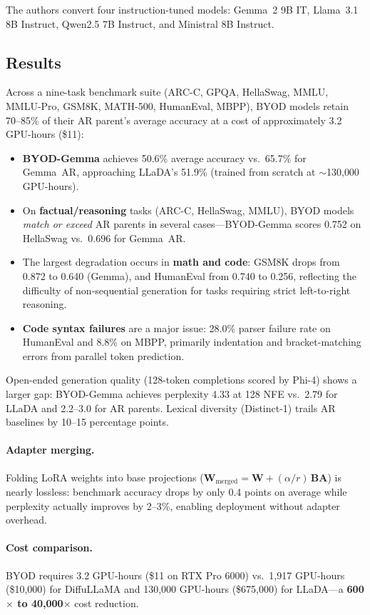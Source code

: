 \documentclass[11pt,a4paper]{article}
\begin{document}
The authors convert four instruction-tuned models: Gemma~2 9B IT, Llama~3.1 8B Instruct, Qwen2.5 7B Instruct, and Ministral 8B Instruct.

\subsection{Results}
Across a nine-task benchmark suite (ARC-C, GPQA, HellaSwag, MMLU, MMLU-Pro, GSM8K, MATH-500, HumanEval, MBPP), BYOD models retain 70--85\% of their AR parent's average accuracy at a cost of approximately 3.2 GPU-hours (\$11):

\begin{itemize}
  \item \textbf{BYOD-Gemma} achieves 50.6\% average accuracy vs.\ 65.7\% for Gemma~AR, approaching LLaDA's 51.9\% (trained from scratch at $\sim$130{,}000 GPU-hours).
  \item On \textbf{factual/reasoning} tasks (ARC-C, HellaSwag, MMLU), BYOD models \emph{match or exceed} AR parents in several cases---BYOD-Gemma scores 0.752 on HellaSwag vs.\ 0.696 for Gemma~AR.
  \item The largest degradation occurs in \textbf{math and code}: GSM8K drops from 0.872 to 0.640 (Gemma), and HumanEval from 0.740 to 0.256, reflecting the difficulty of non-sequential generation for tasks requiring strict left-to-right reasoning.
  \item \textbf{Code syntax failures} are a major issue: 28.0\% parser failure rate on HumanEval and 8.8\% on MBPP, primarily indentation and bracket-matching errors from parallel token prediction.
\end{itemize}

Open-ended generation quality (128-token completions scored by Phi-4) shows a larger gap: BYOD-Gemma achieves perplexity 4.33 at 128 NFE vs.\ 2.79 for LLaDA and 2.2--3.0 for AR parents. Lexical diversity (Distinct-1) trails AR baselines by 10--15 percentage points.

\paragraph{Adapter merging.}
Folding LoRA weights into base projections ($\mathbf{W}_{\mathrm{merged}} = \mathbf{W} + (\alpha/r)\,\mathbf{B}\mathbf{A}$) is nearly lossless: benchmark accuracy drops by only 0.4 points on average while perplexity actually improves by 2--3\%, enabling deployment without adapter overhead.

\paragraph{Cost comparison.}
BYOD requires 3.2 GPU-hours (\$11 on RTX Pro 6000) vs.\ 1{,}917 GPU-hours (\$10{,}000) for DiffuLLaMA and 130{,}000 GPU-hours (\$675{,}000) for LLaDA---a \textbf{600$\times$ to 40{,}000$\times$} cost reduction.
\end{document}
